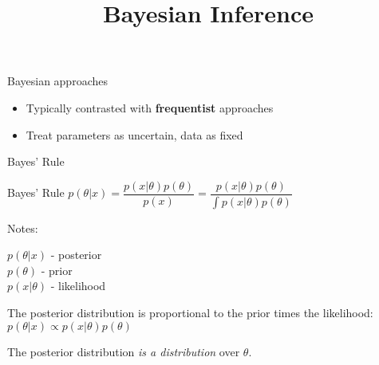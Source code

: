 \documentclass[10pt]{beamer}
\title{Bayesian Inference}
\begin{document}
\maketitle




\begin{frame}{Bayesian approaches}

\begin{itemize}
\item Typically contrasted with \textbf{frequentist} approaches
\item Treat parameters as uncertain, data as fixed
\end{itemize}
\end{frame}


\begin{frame}{Bayes' Rule}

\begin{sblock}{Bayes' Rule}
$ p(\theta | x) = \dfrac{p(x | \theta) p(\theta)}{p(x)} =\dfrac{p(x | \theta) p(\theta)}{\int p(x | \theta) p(\theta)}  $
\end{sblock}

\begin{sblock}{Notes:}

$p(\theta | x)$ - posterior \\
$p(\theta)$ - prior \\
$p(x | \theta)$ - likelihood

The posterior distribution is proportional to the prior times the likelihood:
$p(\theta | x) \propto p(x | \theta) p(\theta)$

The posterior distribution \textit{is a distribution} over $\theta$.

\end{sblock}

\end{frame}

\end{document}
